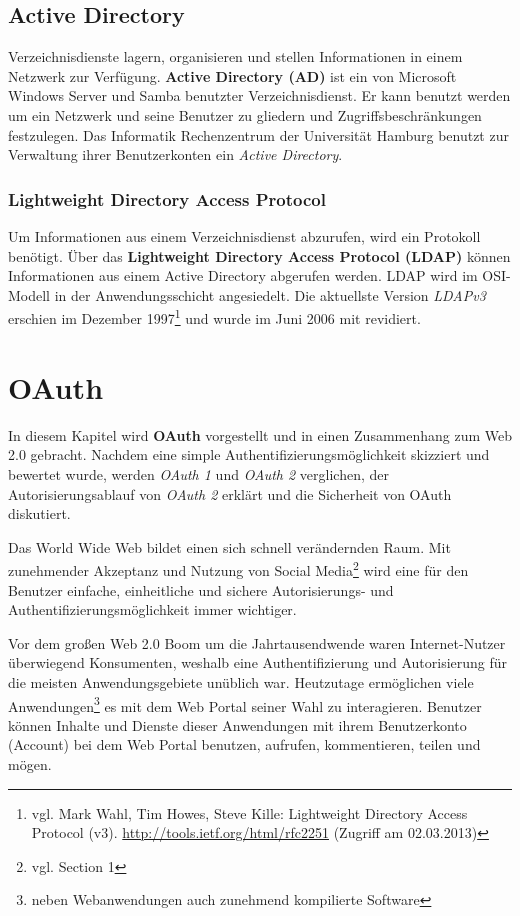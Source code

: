 \documentclass[12pt,a4paper,pointednumbers,abstracton]{scrartcl}
\begin{document}
\subsection{Active Directory}

Verzeichnisdienste lagern, organisieren und stellen Informationen in einem Netzwerk zur Verfügung.
\textbf{Active Directory (AD)} ist ein von Microsoft Windows Server und Samba benutzter Verzeichnisdienst.
Er kann benutzt werden um ein Netzwerk und seine Benutzer zu gliedern und Zugriffsbeschränkungen festzulegen.
Das Informatik Rechenzentrum der Universität Hamburg benutzt zur Verwaltung ihrer Benutzerkonten ein \emph{Active Directory}.

\subsubsection{Lightweight Directory Access Protocol}

Um Informationen aus einem Verzeichnisdienst abzurufen, wird ein Protokoll benötigt.
Über das \textbf{Lightweight Directory Access Protocol (LDAP)} können Informationen aus einem Active Directory abgerufen werden.
LDAP wird im OSI-Modell in der Anwendungsschicht angesiedelt.
Die aktuellste Version \emph{LDAPv3} erschien im Dezember 1997\footnote{vgl. Mark Wahl, Tim Howes, Steve Kille: Lightweight Directory Access Protocol (v3). \url{http://tools.ietf.org/html/rfc2251} (Zugriff am 02.03.2013)} und wurde im Juni 2006 mit \cite{RFC5246} revidiert.

\newpage
\section{OAuth}
\label{sec:oauth}

In diesem Kapitel wird \textbf{OAuth} vorgestellt und in einen Zusammenhang zum Web 2.0 gebracht.
Nachdem eine simple Authentifizierungsmöglichkeit skizziert und bewertet wurde, werden \emph{OAuth 1} und \emph{OAuth 2} verglichen, der Autorisierungsablauf von \emph{OAuth 2} erklärt und die Sicherheit von OAuth diskutiert.

Das World Wide Web bildet einen sich schnell verändernden Raum.
Mit zunehmender Akzeptanz und Nutzung von Social Media\footnote{vgl. \cite{KapHae2010} Section 1} wird eine für den Benutzer einfache, einheitliche und sichere Autorisierungs- und Authentifizierungsmöglichkeit immer wichtiger.

Vor dem großen Web 2.0 Boom um die Jahrtausendwende waren Internet-Nutzer überwiegend Konsumenten, weshalb eine Authentifizierung und Autorisierung für die meisten Anwendungsgebiete unüblich war.
Heutzutage ermöglichen viele Anwendungen\footnote{neben Webanwendungen auch zunehmend kompilierte Software} es mit dem Web Portal seiner Wahl zu interagieren.
Benutzer können Inhalte und Dienste dieser Anwendungen mit ihrem Benutzerkonto (Account) bei dem Web Portal benutzen, aufrufen, kommentieren, teilen und mögen.
\end{document}
